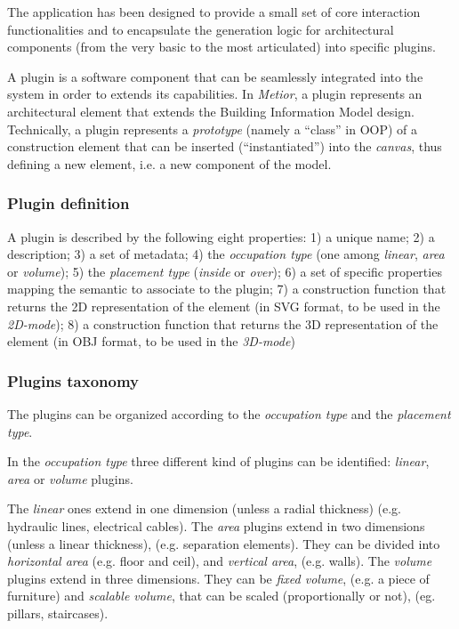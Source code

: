 \noindent The application has been designed to provide a small set of core interaction functionalities and to encapsulate the generation logic for architectural components (from the very basic to the most articulated) into specific plugins.

\noindent A plugin is a software component that can be seamlessly integrated into the system in order to extends its capabilities.
In \emph{Metior}, a plugin represents an architectural element that extends the Building Information Model design.
Technically, a plugin represents a \emph{prototype} (namely a ``class'' in OOP) of a construction element that can be inserted (``instantiated'') into the \emph{canvas}, thus defining a new element, i.e. a new component of the model.

\subsubsection{Plugin definition}

A plugin is described by the following eight properties: 1) a unique name; 2) a description; 3) a set of metadata; 4) the \emph{occupation type} (one among \emph{linear}, \emph{area} or \emph{volume}); 5) the \emph{placement type} (\emph{inside} or \emph{over}); 6) a set of specific properties mapping the semantic to associate to the plugin; 7) a construction function that returns the 2D representation of the element (in SVG format, to be used in the \emph{2D-mode}); 8) a construction function that returns the 3D representation of the element (in OBJ format, to be used in the \emph{3D-mode})

\subsubsection{Plugins taxonomy}\label{ssec:taxonomy}

\noindent The plugins can be organized according to the \emph{occupation type} and the \emph{placement type}. 

\noindent In the \emph{occupation type} three different kind of plugins can be identified: \emph{linear}, \emph{area} or \emph{volume} plugins.

\noindent The \emph{linear} ones extend in one dimension (unless a radial thickness) (e.g. hydraulic lines, electrical cables). The \emph{area} plugins extend in two dimensions (unless a linear thickness), (e.g. separation elements). They can be divided into \emph{horizontal area} (e.g. floor and ceil), and \emph{vertical area}, (e.g. walls). The \emph{volume} plugins extend in three dimensions. They can be \emph{fixed volume}, (e.g. a piece of furniture) and \emph{scalable volume}, that can be scaled (proportionally or not), (eg. pillars, staircases).

